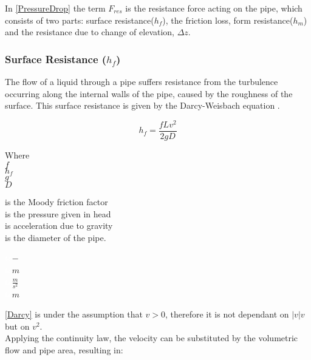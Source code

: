 In \eqref{PressureDrop} the term $F_{res}$ is the resistance force acting on the 
pipe, which consists of two parts: surface resistance($h_{f}$), the friction 
loss, form resistance($h_{m}$) and the resistance due to change of elevation, $\Delta z$. 

\subsubsection{Surface Resistance (\texorpdfstring{$h_f$}{})} 
The flow of a liquid through a pipe suffers resistance from 
the turbulence occurring along the internal walls of the pipe, caused by the roughness of the surface. This surface resistance is given by the Darcy-Weisbach equation \cite{Design_Water}.

\begin{equation}
  h_f = \frac{fLv^2}{2gD}
  \label{Darcy}
\end{equation}

 \begin{minipage}[t]{0.20\textwidth}
Where\\
\hspace*{8mm} $f$ \\
\hspace*{8mm} $h_f$ \\
\hspace*{8mm} $g$ \\
\hspace*{8mm} $D$ 
\end{minipage}
\begin{minipage}[t]{0.68\textwidth}
\vspace*{2mm}
is the Moody friction factor\\ 
is the pressure given in head\\ 
is acceleration due to gravity\\
is the diameter of the pipe.
\end{minipage}
\begin{minipage}[t]{0.10\textwidth}
\vspace*{2mm}
\textcolor{White}{te}$\unit{-}$\\
\textcolor{White}{te}$\unit{m}$\\
\textcolor{White}{te}$\unit{\frac{m}{s^2}}$\\
\textcolor{White}{te}$\unit{m}$
\end{minipage}

\eqref{Darcy} is under the assumption that $v>0$, therefore it is not dependant on $|v|v$ but on $v^2$. \\
Applying the continuity law, the velocity can be substituted by the volumetric flow and pipe area, resulting in:

